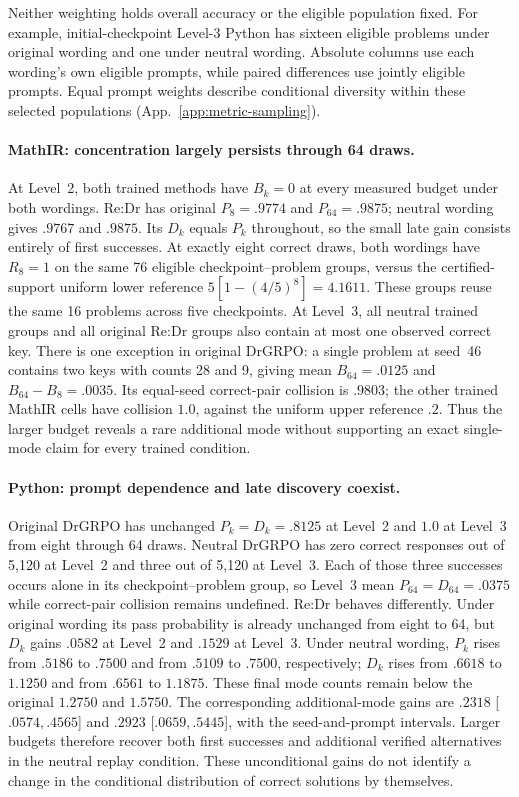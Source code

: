 \documentclass{article}
\newcommand{\1}{\mathbf 1}
\theoremstyle{remark}
\theoremstyle{definition}
\theoremstyle{plain}
\begin{document}
Neither weighting holds overall accuracy or the eligible population fixed.
For example, initial-checkpoint Level-3 Python has sixteen eligible problems
under original wording and one under neutral wording. Absolute columns use
each wording's own eligible prompts, while paired differences use jointly
eligible prompts. Equal prompt weights describe conditional diversity within
these selected populations (App.~\ref{app:metric-sampling}).

\paragraph{MathIR: concentration largely persists through 64 draws.}
At Level~2, both trained methods have $B_k=0$ at every measured budget under
both wordings. Re:Dr has original $P_8=.9774$ and $P_{64}=.9875$;
neutral wording gives $.9767$ and $.9875$. Its $D_k$ equals $P_k$ throughout,
so the small late gain consists entirely of first successes. At exactly eight
correct draws, both wordings have $R_8=1$ on the same 76 eligible
checkpoint--problem groups, versus the certified-support uniform lower
reference $5[1-(4/5)^8]=4.1611$. These groups reuse the same 16 problems
across five checkpoints. At Level~3, all neutral trained groups and all
original Re:Dr groups also contain at most one observed correct key.
There is one exception in original DrGRPO: a single problem at seed~46
contains two keys with counts 28 and 9, giving mean $B_{64}=.0125$ and
$B_{64}-B_8=.0035$. Its equal-seed correct-pair collision is $.9803$;
the other trained MathIR cells have collision $1.0$, against the uniform
upper reference $.2$. Thus the larger budget reveals a rare additional mode
without supporting an exact single-mode claim for every trained condition.

\paragraph{Python: prompt dependence and late discovery coexist.}
Original DrGRPO has unchanged $P_k=D_k=.8125$ at Level~2 and $1.0$ at
Level~3 from eight through 64 draws. Neutral DrGRPO has zero correct responses
out of 5,120 at Level~2 and three out of 5,120 at Level~3. Each of those
three successes occurs alone in its checkpoint--problem group, so Level~3
mean $P_{64}=D_{64}=.0375$ while correct-pair collision remains undefined.
Re:Dr behaves differently. Under original wording its pass probability
is already unchanged from eight to 64, but $D_k$ gains $.0582$ at Level~2
and $.1529$ at Level~3. Under neutral wording, $P_k$ rises from $.5186$ to
$.7500$ and from $.5109$ to $.7500$, respectively; $D_k$ rises from $.6618$
to $1.1250$ and from $.6561$ to $1.1875$. These final mode counts remain
below the original $1.2750$ and $1.5750$. The corresponding additional-mode
gains are $.2318$ [$.0574,.4565$] and $.2923$ [$.0659,.5445$], with the
seed-and-prompt intervals. Larger budgets therefore recover both
first successes and additional verified alternatives in the neutral replay
condition. These unconditional gains do not identify a change in the
conditional distribution of correct solutions by themselves.
\end{document}
